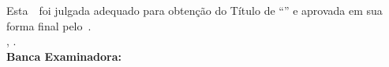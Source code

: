 \imprimircapa

\imprimirfolhaderosto*

\begin{fichacatalografica}
	
\end{fichacatalografica}

\begin{folhadeaprovacao}
	\OnehalfSpacing
	\centering
	\imprimirautor\\%
	\vspace*{10pt}		
	\textbf{\imprimirtitulo}%
	\ifnotempty{\imprimirsubtitulo}{:~\imprimirsubtitulo}\\%
	\vspace*{\baselineskip}
	Esta~\imprimirtipotrabalho~foi julgada adequado para obtenção do Título de “\imprimirformacao” e aprovada em sua forma final pelo~\imprimirprograma. \\
		\vspace*{\baselineskip}
	\imprimirlocal, \imprimirdata. \\
	\vspace*{2\baselineskip}
	\vspace*{2\baselineskip}
	\textbf{Banca Examinadora:} \\
	\vspace*{\baselineskip}
	\assinatura{\OnehalfSpacing\imprimirorientador \\ \imprimirorientadorRotulo}
	\vspace*{\baselineskip}

	\vspace*{\baselineskip}


\end{folhadeaprovacao}
